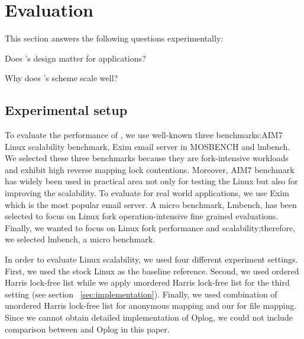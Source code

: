 \section{Evaluation}

This section answers the following questions experimentally:
\begin{CompactItemize}
\item Does \ldu's design matter for applications?

\item Why does \ldu's scheme scale well?
\end{CompactItemize}


\subsection{Experimental setup}



To evaluate the performance of , we use well-known
three benchmarks:AIM7 Linux scalability benchmark, Exim email server in
MOSBENCH and lmbench.
We selected these three benchmarks because they are fork-intensive workloads and
exhibit high reverse mapping lock contentions.
Moreover, AIM7 benchmark has widely been used in practical area not only for testing the
Linux but also for improving the scalability. 
To evaluate  for real world
applications, we use Exim which is the most popular email server.
A micro benchmark, Lmbench, has been selected to focus on Linux fork operation-intensive
fine grained evaluations.
Finally, we wanted to focus on Linux fork performance and scalability;therefore,
we selected lmbench, a micro benchmark.


In order to evaluate Linux scalability, we used four different experiment
settings.
First, we used the stock Linux as the baseline reference. 
Second, we used ordered Harris lock-free list while 
we apply unordered Harris lock-free list for the third setting
(see section ~\ref{sec:implementation}). 
Finally, we used combination of unordered Harris lock-free list for anonymous mapping and
our  for file mapping.
Since we cannot obtain detailed implementation of Oplog, 
we could not include comparison between  and Oplog in this paper.


